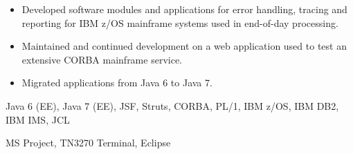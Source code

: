 \medskip
\begin{itemize}
	\item Developed software modules and applications for error handling, tracing and reporting for IBM z/OS mainframe systems used in end-of-day processing.
	\item Maintained and continued development on a web application used to test an extensive CORBA mainframe service.
	\item Migrated applications from Java 6 to Java 7.
\end{itemize}

\medskip
\begin{description}
	\ifincludestech
	\item [Technologies] Java 6 (EE), Java 7 (EE), JSF, Struts, CORBA, PL/1, IBM z/OS, IBM DB2, IBM IMS, JCL
	\fi
	\ifincludestools
	\item [Tools] MS Project, TN3270 Terminal, Eclipse
	\fi
\end{description}
